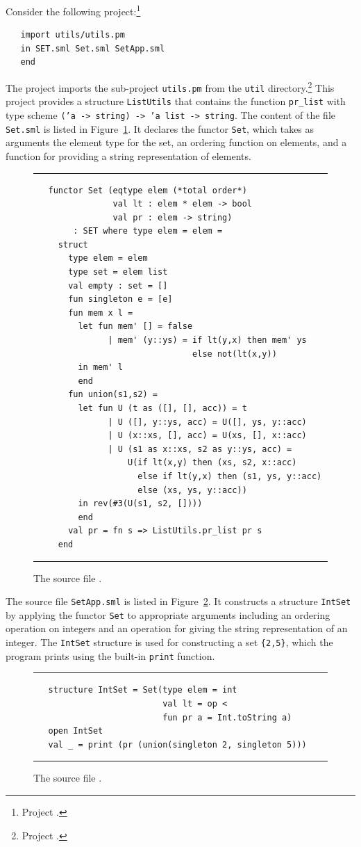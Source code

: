 \documentclass[12pt]{book}
\begin{document}
Consider the following project:\footnote{Project
  .}
\begin{verbatim}
   import utils/utils.pm
   in SET.sml Set.sml SetApp.sml
   end
\end{verbatim}
The project imports the sub-project {\tt utils.pm} from the {\tt util}
directory.\footnote{Project .} This
project provides a structure {\tt ListUtils} that contains the
function {\tt pr\_list} with type scheme {\tt ('a -> string) -> 'a
  list -> string}. The content of the file {\tt Set.sml} is listed in
Figure~\ref{Set.fig}. It declares the functor {\tt Set}, which takes
as arguments the element type for the set, an ordering function on
elements, and a function for providing a string representation of
elements.
\begin{figure}[ht]
\hrule \medskip
\begin{verbatim}
   functor Set (eqtype elem (*total order*)
                val lt : elem * elem -> bool
                val pr : elem -> string) 
        : SET where type elem = elem =
     struct
       type elem = elem
       type set = elem list
       val empty : set = []
       fun singleton e = [e]
       fun mem x l =
         let fun mem' [] = false
               | mem' (y::ys) = if lt(y,x) then mem' ys
                                else not(lt(x,y))
         in mem' l
         end
       fun union(s1,s2) =
         let fun U (t as ([], [], acc)) = t
               | U ([], y::ys, acc) = U([], ys, y::acc)
               | U (x::xs, [], acc) = U(xs, [], x::acc)
               | U (s1 as x::xs, s2 as y::ys, acc) =
                   U(if lt(x,y) then (xs, s2, x::acc)
                     else if lt(y,x) then (s1, ys, y::acc)
                     else (xs, ys, y::acc))
         in rev(#3(U(s1, s2, [])))
         end
       val pr = fn s => ListUtils.pr_list pr s
     end
\end{verbatim}
\caption{The source file .}
\medskip \hrule \label{Set.fig} 
\end{figure}

The source file {\tt SetApp.sml} is listed in
Figure~\ref{SetApp.fig}. It constructs a structure {\tt IntSet} by
applying the functor {\tt Set} to appropriate arguments including an
ordering operation on integers and an operation for giving the string
representation of an integer. The {\tt IntSet} structure is used for
constructing a set \verb+{2,5}+, which the program prints using the
built-in {\tt print} function.
\begin{figure}[ht]
\hrule \medskip
\begin{verbatim}
   structure IntSet = Set(type elem = int
                          val lt = op <
                          fun pr a = Int.toString a)
   open IntSet
   val _ = print (pr (union(singleton 2, singleton 5)))
\end{verbatim}
\caption{The source file .}
\medskip \hrule \label{SetApp.fig} 
\end{figure}
\end{document}
